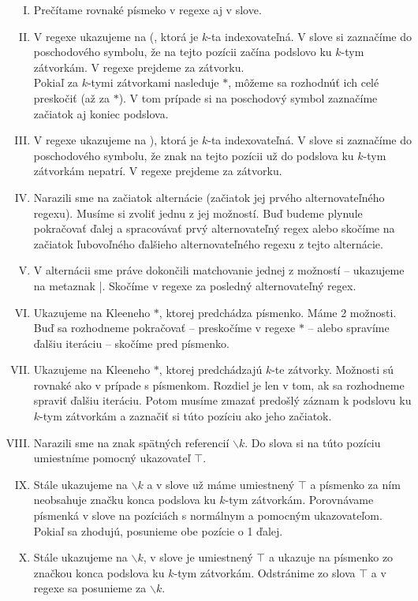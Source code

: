 \begin{df}
\begin{enumerate}[I.]
\item Prečítame rovnaké písmeko v regexe aj v slove.
\item V regexe ukazujeme na (, ktorá je $k$-ta indexovateľná. V slove si zaznačíme do poschodového symbolu, že na tejto pozícii začína podslovo ku $k$-tym zátvorkám. V regexe prejdeme za zátvorku.
\\ Pokiaľ za $k$-tymi zátvorkami nasleduje $*$, môžeme sa rozhodnúť ich celé preskočiť (až za $*$). V tom prípade si na poschodový symbol zaznačíme začiatok aj koniec podslova.
\item V regexe ukazujeme na ), ktorá je $k$-ta indexovateľná. V slove si zaznačíme do poschodového symbolu, že znak na tejto pozícii už do podslova ku $k$-tym zátvorkám nepatrí. V regexe prejdeme za zátvorku.
\item Narazili sme na začiatok alternácie (začiatok jej prvého alternovateľného regexu). Musíme si zvoliť jednu z jej možností. Buď budeme plynule pokračovať ďalej a spracovávať prvý alternovateľný regex alebo skočíme na začiatok ľubovoľného ďalšieho alternovateľného regexu z tejto alternácie.
\item V alternácii sme práve dokončili matchovanie jednej z možností -- ukazujeme na metaznak |. Skočíme v regexe za posledný alternovateľný regex.
\item Ukazujeme na Kleeneho $*$, ktorej predchádza písmenko. Máme 2 možnosti. Buď sa rozhodneme pokračovať -- preskočíme v regexe $*$ -- alebo spravíme ďalšiu iteráciu -- skočíme pred písmenko.
\item Ukazujeme na Kleeneho $*$, ktorej predchádzajú $k$-te zátvorky. Možnosti sú rovnaké ako v prípade s písmenkom. Rozdiel je len v tom, ak sa rozhodneme spraviť ďalšiu iteráciu. Potom musíme zmazať predošlý záznam k podslovu ku $k$-tym zátvorkám a zaznačiť si túto pozíciu ako jeho začiatok.
\item Narazili sme na znak spätných referencií $\backslash k$. Do slova si na túto pozíciu umiestníme pomocný ukazovateľ $\intercal$.
\item Stále ukazujeme na $\backslash k$ a v slove už máme umiestnený $\intercal$ a písmenko za ním neobsahuje značku konca podslova ku $k$-tym zátvorkám. Porovnávame písmenká v slove na pozíciách s normálnym a pomocným ukazovateľom. Pokiaľ sa zhodujú, posunieme obe pozície o 1 ďalej.
\item Stále ukazujeme na $\backslash k$, v slove je umiestnený $\intercal$ a ukazuje na písmenko zo značkou konca podslova ku $k$-tym zátvorkám. Odstránime zo slova $\intercal$ a v regexe sa posunieme za $\backslash k$.

\end{enumerate}
\end{df}
